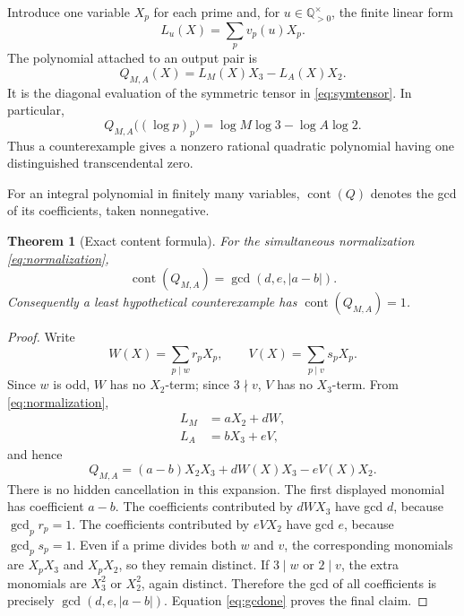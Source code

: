 \documentclass[11pt]{article}
\numberwithin{equation}{section}
\newtheorem{theorem}{Theorem}[section]
\theoremstyle{definition}
\theoremstyle{remark}
\newcommand{\Q}{\mathbb Q}
\newcommand{\cont}{\operatorname{cont}}
\begin{document}
Introduce one variable \(X_p\) for each prime and, for \(u\in\Q_{>0}^{\times}\), the finite
linear form
\[
 L_u(X)=\sum_p v_p(u)X_p.
\]
The polynomial attached to an output pair is
\begin{equation}
 Q_{M,A}(X)=L_M(X)X_3-L_A(X)X_2.\label{eq:Qdef}
\end{equation}
It is the diagonal evaluation of the symmetric tensor in \eqref{eq:symtensor}.  In
particular,
\begin{equation}
 Q_{M,A}\bigl((\log p)_p\bigr)
 =\log M\log3-\log A\log2.\label{eq:realperiod}
\end{equation}
Thus a counterexample gives a nonzero rational quadratic polynomial having one distinguished
transcendental zero.

For an integral polynomial in finitely many variables, \(\cont(Q)\) denotes the gcd of its
coefficients, taken nonnegative.

\begin{theorem}[Exact content formula]
\label{thm:content}
For the simultaneous normalization \eqref{eq:normalization},
\begin{equation}
 \cont(Q_{M,A})=\gcd(d,e,|a-b|).\label{eq:content}
\end{equation}
Consequently a least hypothetical counterexample has \(\cont(Q_{M,A})=1\).
\end{theorem}

\begin{proof}
Write
\[
 W(X)=\sum_{p\mid w}r_pX_p,
 \qquad
 V(X)=\sum_{p\mid v}s_pX_p.
\]
Since \(w\) is odd, \(W\) has no \(X_2\)-term; since \(3\nmid v\), \(V\) has no
\(X_3\)-term.  From \eqref{eq:normalization},
\begin{align*}
 L_M&=aX_2+dW,\\
 L_A&=bX_3+eV,
\end{align*}
and hence
\begin{equation}
 Q_{M,A}=(a-b)X_2X_3+dW(X)X_3-eV(X)X_2.\label{eq:Qexpanded}
\end{equation}
There is no hidden cancellation in this expansion.  The first displayed monomial has
coefficient \(a-b\).  The coefficients contributed by \(dWX_3\) have gcd \(d\), because
\(\gcd_pr_p=1\).  The coefficients contributed by \(eVX_2\) have gcd \(e\), because
\(\gcd_ps_p=1\).  Even if a prime divides both \(w\) and \(v\), the corresponding monomials
are \(X_pX_3\) and \(X_pX_2\), so they remain distinct.  If \(3\mid w\) or \(2\mid v\), the
extra monomials are \(X_3^2\) or \(X_2^2\), again distinct.  Therefore the gcd of all
coefficients is precisely \(\gcd(d,e,|a-b|)\).  Equation \eqref{eq:gcdone} proves the final
claim.
\end{proof}
\end{document}
